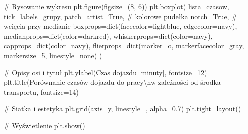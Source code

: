 \documentclass[
  polish,
  letterpaper,
  DIV=11,
  numbers=noendperiod]{scrreprt}
\newenvironment{Shaded}{\begin{snugshade}}{\end{snugshade}}
\newcommand{\BuiltInTok}[1]{\textcolor[rgb]{0.00,0.23,0.31}{#1}}
\newcommand{\CharTok}[1]{\textcolor[rgb]{0.13,0.47,0.30}{#1}}
\newcommand{\CommentTok}[1]{\textcolor[rgb]{0.37,0.37,0.37}{#1}}
\newcommand{\DecValTok}[1]{\textcolor[rgb]{0.68,0.00,0.00}{#1}}
\newcommand{\FloatTok}[1]{\textcolor[rgb]{0.68,0.00,0.00}{#1}}
\newcommand{\NormalTok}[1]{\textcolor[rgb]{0.00,0.23,0.31}{#1}}
\newcommand{\OperatorTok}[1]{\textcolor[rgb]{0.37,0.37,0.37}{#1}}
\newcommand{\StringTok}[1]{\textcolor[rgb]{0.13,0.47,0.30}{#1}}
\newcommand{\VariableTok}[1]{\textcolor[rgb]{0.07,0.07,0.07}{#1}}
\newcounter{none} %
\begin{document}
\begin{Shaded}
\begin{Highlighting}[]
\CommentTok{\# Rysowanie wykresu}
\NormalTok{plt.figure(figsize}\OperatorTok{=}\NormalTok{(}\DecValTok{8}\NormalTok{, }\DecValTok{6}\NormalTok{))}
\NormalTok{plt.boxplot(}
\NormalTok{    lista\_czasow,}
\NormalTok{    tick\_labels}\OperatorTok{=}\NormalTok{grupy,}
\NormalTok{    patch\_artist}\OperatorTok{=}\VariableTok{True}\NormalTok{,    }\CommentTok{\# kolorowe pudełka}
\NormalTok{    notch}\OperatorTok{=}\VariableTok{True}\NormalTok{,           }\CommentTok{\# wcięcia przy medianie}
\NormalTok{    boxprops}\OperatorTok{=}\BuiltInTok{dict}\NormalTok{(facecolor}\OperatorTok{=}\StringTok{\textquotesingle{}lightblue\textquotesingle{}}\NormalTok{, edgecolor}\OperatorTok{=}\StringTok{\textquotesingle{}navy\textquotesingle{}}\NormalTok{),}
\NormalTok{    medianprops}\OperatorTok{=}\BuiltInTok{dict}\NormalTok{(color}\OperatorTok{=}\StringTok{\textquotesingle{}darkred\textquotesingle{}}\NormalTok{),}
\NormalTok{    whiskerprops}\OperatorTok{=}\BuiltInTok{dict}\NormalTok{(color}\OperatorTok{=}\StringTok{\textquotesingle{}navy\textquotesingle{}}\NormalTok{),}
\NormalTok{    capprops}\OperatorTok{=}\BuiltInTok{dict}\NormalTok{(color}\OperatorTok{=}\StringTok{\textquotesingle{}navy\textquotesingle{}}\NormalTok{),}
\NormalTok{    flierprops}\OperatorTok{=}\BuiltInTok{dict}\NormalTok{(marker}\OperatorTok{=}\StringTok{\textquotesingle{}o\textquotesingle{}}\NormalTok{, markerfacecolor}\OperatorTok{=}\StringTok{\textquotesingle{}gray\textquotesingle{}}\NormalTok{, markersize}\OperatorTok{=}\DecValTok{5}\NormalTok{, linestyle}\OperatorTok{=}\StringTok{\textquotesingle{}none\textquotesingle{}}\NormalTok{)}
\NormalTok{)}

\CommentTok{\# Opisy osi i tytuł}
\NormalTok{plt.ylabel(}\StringTok{\textquotesingle{}Czas dojazdu [minuty]\textquotesingle{}}\NormalTok{, fontsize}\OperatorTok{=}\DecValTok{12}\NormalTok{)}
\NormalTok{plt.title(}\StringTok{\textquotesingle{}Porównanie czasów dojazdu do pracy}\CharTok{\textbackslash{}n}\StringTok{w zależności od środka transportu\textquotesingle{}}\NormalTok{, fontsize}\OperatorTok{=}\DecValTok{14}\NormalTok{)}

\CommentTok{\# Siatka i estetyka}
\NormalTok{plt.grid(axis}\OperatorTok{=}\StringTok{\textquotesingle{}y\textquotesingle{}}\NormalTok{, linestyle}\OperatorTok{=}\StringTok{\textquotesingle{}{-}{-}\textquotesingle{}}\NormalTok{, alpha}\OperatorTok{=}\FloatTok{0.7}\NormalTok{)}
\NormalTok{plt.tight\_layout()}

\CommentTok{\# Wyświetlenie}
\NormalTok{plt.show()}
\end{Highlighting}
\end{Shaded}
\end{document}
